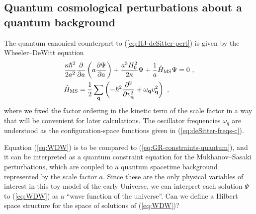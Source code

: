 \documentclass[12pt]{iopart}
\def\eq#1{\begin{equation}\begin{aligned}#1\end{aligned}\end{equation}}
\def\eref#1{(\ref{eq:#1})}
\def\del#1#2{\frac{\partial#1}{\partial#2}}
\def\q{\mathbf{q}}
\begin{document}
\subsection{Quantum cosmological perturbations about a quantum background}
The quantum canonical counterpart to \eref{HJ-deSitter-pert} is given by the Wheeler--DeWitt equation
\eq{\label{eq:WDW}
&\frac{\kappa\hbar^2}{2a^2}\del{}{a}\left(a\del{\Psi}{a}\right)+\frac{a^3H_0^2}{2\kappa}\Psi+\frac{1}{a}\hat{H}_{\rm MS}\Psi = 0 \ , \\
&\hat{H}_{\rm MS} = \frac{1}{2}\sum_{\q}\left(-\hbar^2\del{^2}{v_{\q}^2}+\omega_{\q}v_{\q}^2\right) \ ,
}
where we fixed the factor ordering in the kinetic term of the scale factor in a way that will be convenient for later calculations. The oscillator frequencies $\omega_{q}$ are understood as the configuration-space functions given in \eref{deSitter-freqs-c}.

Equation \eref{WDW} is to be compared to \eref{GR-constraints-quantum}, and it can be interpreted as a quantum constraint equation for the Mukhanov--Sasaki perturbations, which are coupled to a quantum spacetime background represented by the scale factor $a$. Since these are the only physical variables of interest in this toy model of the early Universe, we can interpret each solution $\Psi$ to \eref{WDW} as a ``wave function of the universe''. Can we define a Hilbert space structure for the space of solutions of \eref{WDW}?
\end{document}
